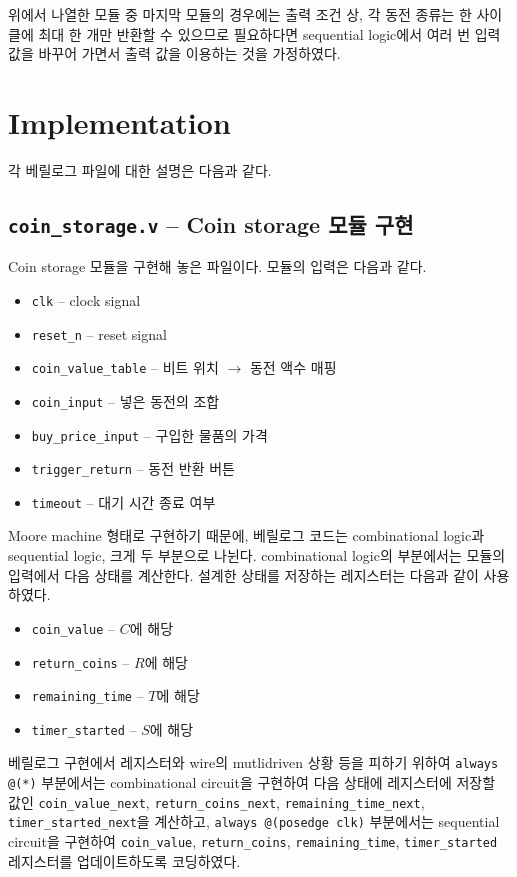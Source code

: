\documentclass{scrartcl}
\begin{document}
위에서 나열한 모듈 중 마지막 모듈의 경우에는 출력 조건 상, 각 동전 종류는 한 사이클에 최대 한 개만 반환할 수 있으므로 필요하다면
sequential logic에서 여러 번 입력 값을 바꾸어 가면서 출력 값을 이용하는 것을 가정하였다.

\section{Implementation}
각 베릴로그 파일에 대한 설명은 다음과 같다.

\subsection{\texttt{coin\_storage.v} -- Coin storage 모듈 구현}
Coin storage 모듈을 구현해 놓은 파일이다. 모듈의 입력은 다음과 같다.

\begin{itemize}
  \item \texttt{clk} -- clock signal
  \item \texttt{reset\_n} -- reset signal
  \item \texttt{coin\_value\_table} -- 비트 위치 \(\to\) 동전 액수 매핑
  \item \texttt{coin\_input} -- 넣은 동전의 조합
  \item \texttt{buy\_price\_input} -- 구입한 물품의 가격
  \item \texttt{trigger\_return} -- 동전 반환 버튼
  \item \texttt{timeout} -- 대기 시간 종료 여부
\end{itemize}

Moore machine 형태로 구현하기 때문에, 베릴로그 코드는 combinational logic과 sequential logic, 크게
두 부분으로 나뉜다. combinational logic의 부분에서는 모듈의 입력에서 다음 상태를 계산한다. 설계한 상태를 저장하는 레지스터는
다음과 같이 사용하였다.

\begin{itemize}
  \item \texttt{coin\_value} -- \(C\)에 해당
  \item \texttt{return\_coins} -- \(R\)에 해당
  \item \texttt{remaining\_time} -- \(T\)에 해당
  \item \texttt{timer\_started} -- \(S\)에 해당
\end{itemize}

베릴로그 구현에서 레지스터와 wire의 mutlidriven 상황 등을 피하기 위하여 \texttt{always @(*)} 부분에서는
combinational circuit을 구현하여 다음 상태에 레지스터에 저장할 값인 \texttt{coin\_value\_next},
\texttt{return\_coins\_next}, \texttt{remaining\_time\_next},
\texttt{timer\_started\_next}을 계산하고, \texttt{always @(posedge clk)} 부분에서는
sequential circuit을 구현하여 \texttt{coin\_value}, \texttt{return\_coins},
\texttt{remaining\_time}, \texttt{timer\_started} 레지스터를 업데이트하도록 코딩하였다.
\end{document}
